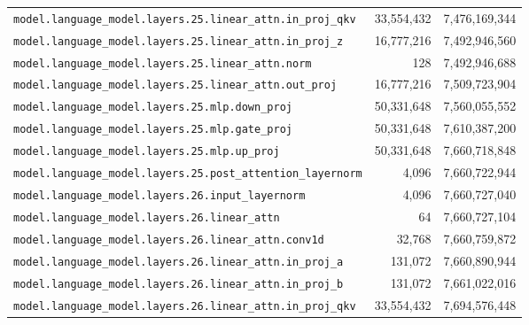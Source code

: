 \documentclass[10pt,a4paper]{article}
\theoremstyle{definition}
\begin{document}
\begin{appendices}
\begin{longtable}{p{9.5cm}rr}
\texttt{model.\allowbreak{}language\_model.\allowbreak{}layers.\allowbreak{}25.\allowbreak{}linear\_attn.\allowbreak{}in\_proj\_qkv} & 33,554,432 & 7,476,169,344 \\
\texttt{model.\allowbreak{}language\_model.\allowbreak{}layers.\allowbreak{}25.\allowbreak{}linear\_attn.\allowbreak{}in\_proj\_z} & 16,777,216 & 7,492,946,560 \\
\texttt{model.\allowbreak{}language\_model.\allowbreak{}layers.\allowbreak{}25.\allowbreak{}linear\_attn.\allowbreak{}norm} & 128 & 7,492,946,688 \\
\texttt{model.\allowbreak{}language\_model.\allowbreak{}layers.\allowbreak{}25.\allowbreak{}linear\_attn.\allowbreak{}out\_proj} & 16,777,216 & 7,509,723,904 \\
\texttt{model.\allowbreak{}language\_model.\allowbreak{}layers.\allowbreak{}25.\allowbreak{}mlp.\allowbreak{}down\_proj} & 50,331,648 & 7,560,055,552 \\
\texttt{model.\allowbreak{}language\_model.\allowbreak{}layers.\allowbreak{}25.\allowbreak{}mlp.\allowbreak{}gate\_proj} & 50,331,648 & 7,610,387,200 \\
\texttt{model.\allowbreak{}language\_model.\allowbreak{}layers.\allowbreak{}25.\allowbreak{}mlp.\allowbreak{}up\_proj} & 50,331,648 & 7,660,718,848 \\
\texttt{model.\allowbreak{}language\_model.\allowbreak{}layers.\allowbreak{}25.\allowbreak{}post\_attention\_layernorm} & 4,096 & 7,660,722,944 \\
\texttt{model.\allowbreak{}language\_model.\allowbreak{}layers.\allowbreak{}26.\allowbreak{}input\_layernorm} & 4,096 & 7,660,727,040 \\
\texttt{model.\allowbreak{}language\_model.\allowbreak{}layers.\allowbreak{}26.\allowbreak{}linear\_attn} & 64 & 7,660,727,104 \\
\texttt{model.\allowbreak{}language\_model.\allowbreak{}layers.\allowbreak{}26.\allowbreak{}linear\_attn.\allowbreak{}conv1d} & 32,768 & 7,660,759,872 \\
\texttt{model.\allowbreak{}language\_model.\allowbreak{}layers.\allowbreak{}26.\allowbreak{}linear\_attn.\allowbreak{}in\_proj\_a} & 131,072 & 7,660,890,944 \\
\texttt{model.\allowbreak{}language\_model.\allowbreak{}layers.\allowbreak{}26.\allowbreak{}linear\_attn.\allowbreak{}in\_proj\_b} & 131,072 & 7,661,022,016 \\
\texttt{model.\allowbreak{}language\_model.\allowbreak{}layers.\allowbreak{}26.\allowbreak{}linear\_attn.\allowbreak{}in\_proj\_qkv} & 33,554,432 & 7,694,576,448 \\

\end{longtable}
\end{appendices}
\end{document}
